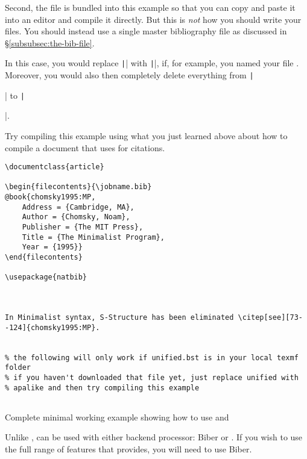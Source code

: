 Second, the  file is bundled into this example so that you can copy and paste it into an editor and compile it directly.
But this is \emph{not} how you should write your  files.
You should instead use a single master bibliography file as discussed in \S\ref{subsubsec:the-bib-file}.

In this case, you would replace \texttt|| with \texttt||, if, for example, you named your  file .
Moreover, you would also then completely delete everything from \texttt|\begin{filecontents}| to \texttt|\end{filecontents}|.

Try compiling this example using what you just learned above about how to compile a  document that uses  for citations.

\begin{listing}[htbp]
	\centering
	\begin{verbatim}
\documentclass{article}

\begin{filecontents}{\jobname.bib}
@book{chomsky1995:MP,
    Address = {Cambridge, MA},
    Author = {Chomsky, Noam},
    Publisher = {The MIT Press},
    Title = {The Minimalist Program},
    Year = {1995}}
\end{filecontents}

\usepackage{natbib}



In Minimalist syntax, S-Structure has been eliminated \citep[see][73--124]{chomsky1995:MP}.


% the following will only work if unified.bst is in your local texmf folder
% if you haven't downloaded that file yet, just replace unified with
% apalike and then try compiling this example


	\end{verbatim}
	\caption{Complete minimal working example showing how to use  and }
	\label{lst:natbib-example}
\end{listing}

\label{subsubsubsec:biblatex}

Unlike ,  can be used with either backend processor: Biber or .
If you wish to use the full range of features that  provides, you will need to use Biber.


